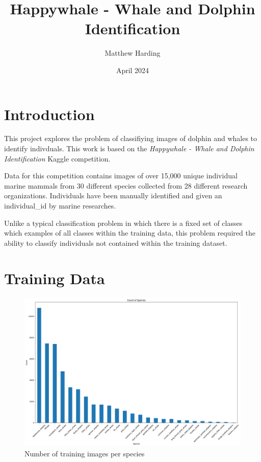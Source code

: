 \documentclass{article}
\title{Happywhale - Whale and Dolphin Identification}
\author{Matthew Harding}
\date{April 2024}
\begin{document}
\maketitle

\section{Introduction}
This project explores the problem of classifiying images of dolphin and whales to identify indivduals. This work 
is based on the \emph{Happywhale - Whale and Dolphin Identification} Kaggle competition.\par

Data for this competition contains images of over 15,000 unique individual marine mammals from 30 different species collected from 28 different research organizations. 
Individuals have been manually identified and given an individual\_id by marine researches.\par

Unlike a typical classification problem in which there is a fixed set of classes which examples of all classes within the training data, this problem required the ability to classify individuals not contained within the training dataset.

\section{Training Data}

\begin{figure}
    \includegraphics[width=\linewidth]{species_histogram.png}
    \caption{Number of training images per species}
    \label{fig:species_count_histogram}
\end{figure}
\end{document}

